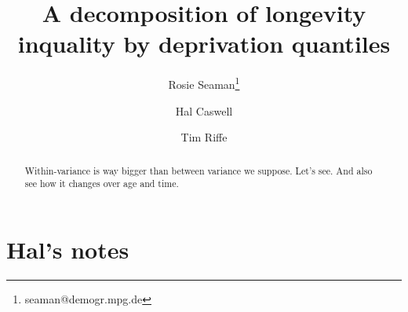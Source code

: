 \documentclass[12pt,oneside,a4paper]{article} %
\theoremstyle{definition}
\begin{document}
\title{A decomposition of longevity inquality by deprivation quantiles}
\author[1]{Rosie Seaman\thanks{seaman@demogr.mpg.de}}
\author[2]{Hal Caswell}
\author[1]{Tim Riffe}


\maketitle

\begin{abstract}
Within-variance is way bigger than between variance we suppose. Let's see. And
also see how it changes over age and time.
\end{abstract}

\section{Hal's notes}
\end{document}
